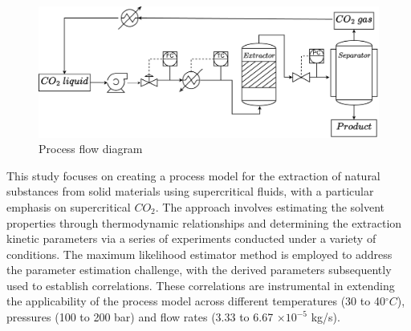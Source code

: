 \documentclass[../Article_Model_Parameters.tex]{subfiles}
\begin{document}
	\begin{figure}[h!]
		\centering
		\includegraphics[width=\columnwidth]{Figures/PFD.drawio.pdf}
		\caption{Process flow diagram}
		\label{fig: SFE_drawing}
	\end{figure}

	
		
	This study focuses on creating a process model for the extraction of natural substances from solid materials using supercritical fluids, with a particular emphasis on supercritical $CO_2$. The approach involves estimating the solvent properties through thermodynamic relationships and determining the extraction kinetic parameters via a series of experiments conducted under a variety of conditions. The maximum likelihood estimator method is employed to address the parameter estimation challenge, with the derived parameters subsequently used to establish correlations. These correlations are instrumental in extending the applicability of the process model across different temperatures (30 to 40$^\circ C$), pressures (100 to 200 bar) and flow rates (3.33 to 6.67 $\times 10^{-5}$ kg/s).
	
\end{document}
